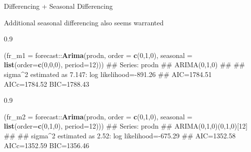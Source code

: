 \documentclass[11pt,ignorenonframetext,]{beamer}
\newenvironment{Shaded}{}{}
\newcommand{\DataTypeTok}[1]{\textcolor[rgb]{0.56,0.13,0.00}{#1}}
\newcommand{\DecValTok}[1]{\textcolor[rgb]{0.25,0.63,0.44}{#1}}
\newcommand{\KeywordTok}[1]{\textcolor[rgb]{0.00,0.44,0.13}{\textbf{#1}}}
\newcommand{\NormalTok}[1]{#1}
\newcommand{\OperatorTok}[1]{\textcolor[rgb]{0.40,0.40,0.40}{#1}}
\let\oldShaded\Shaded
\let\endoldShaded\endShaded
\renewenvironment{Shaded}{\footnotesize\begin{spacing}{0.9}\oldShaded}{\endoldShaded\end{spacing}}
\begin{document}
\begin{frame}[fragile]{%
\protect\hypertarget{differencing-seasonal-differencing}{%
Differencing + Seasonal Differencing}}

Additional seasonal differencing also seems warranted

\begin{Shaded}
\begin{Highlighting}[]
\NormalTok{(}\DataTypeTok{fr_m1 =}\NormalTok{ forecast}\OperatorTok{::}\KeywordTok{Arima}\NormalTok{(prodn, }\DataTypeTok{order =} \KeywordTok{c}\NormalTok{(}\DecValTok{0}\NormalTok{,}\DecValTok{1}\NormalTok{,}\DecValTok{0}\NormalTok{), }
            \DataTypeTok{seasonal =} \KeywordTok{list}\NormalTok{(}\DataTypeTok{order=}\KeywordTok{c}\NormalTok{(}\DecValTok{0}\NormalTok{,}\DecValTok{0}\NormalTok{,}\DecValTok{0}\NormalTok{), }\DataTypeTok{period=}\DecValTok{12}\NormalTok{)))}
\NormalTok{## Series: prodn }
\NormalTok{## ARIMA(0,1,0) }
\NormalTok{## }
\NormalTok{## sigma^2 estimated as 7.147:  log likelihood=-891.26}
\NormalTok{## AIC=1784.51   AICc=1784.52   BIC=1788.43}
\end{Highlighting}
\end{Shaded}

\begin{Shaded}
\begin{Highlighting}[]
\NormalTok{(}\DataTypeTok{fr_m2 =}\NormalTok{ forecast}\OperatorTok{::}\KeywordTok{Arima}\NormalTok{(prodn, }\DataTypeTok{order =} \KeywordTok{c}\NormalTok{(}\DecValTok{0}\NormalTok{,}\DecValTok{1}\NormalTok{,}\DecValTok{0}\NormalTok{), }
            \DataTypeTok{seasonal =} \KeywordTok{list}\NormalTok{(}\DataTypeTok{order=}\KeywordTok{c}\NormalTok{(}\DecValTok{0}\NormalTok{,}\DecValTok{1}\NormalTok{,}\DecValTok{0}\NormalTok{), }\DataTypeTok{period=}\DecValTok{12}\NormalTok{)))}
\NormalTok{## Series: prodn }
\NormalTok{## ARIMA(0,1,0)(0,1,0)[12] }
\NormalTok{## }
\NormalTok{## sigma^2 estimated as 2.52:  log likelihood=-675.29}
\NormalTok{## AIC=1352.58   AICc=1352.59   BIC=1356.46}
\end{Highlighting}
\end{Shaded}

\end{frame}
\end{document}
